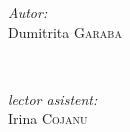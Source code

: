 \begin{center}
	
	
	\vspace{30mm}
	
	
	
	\begin{minipage}{0.4\textwidth}
		
		\begin{flushleft} \large
			
			\emph{Autor:}\\
			
			Dumitrita \textsc{Garaba}
			
		\end{flushleft}
		
	\end{minipage}
	
	~
	
	\begin{minipage}{0.4\textwidth}
		
		\begin{flushright} \large
			
			\emph{lector asistent:} \\
			
			Irina \textsc{Cojanu} \\ %
			
			
			
			
			
		\end{flushright}
		
	\end{minipage}\\[4cm]
	
	
	
	\vspace{5 mm}
	
	
	
	
	
	
	
	
	

\end{center}
